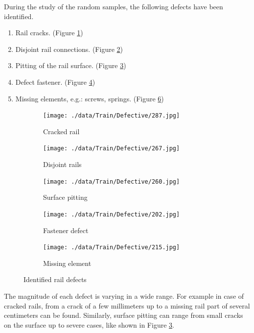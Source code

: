 \documentclass[10pt, final]{article}
\begin{document}
			During the study of the random samples, the following defects have been identified.
			\begin{enumerate}
				\item Rail cracks. (Figure \ref{fig:def_cracked})
				\item Disjoint rail connections. (Figure \ref{fig:def_disjoint})
				\item Pitting of the rail surface. (Figure \ref{fig:def_pitting})
				\item Defect fastener. (Figure \ref{fig:def_nofix})
				\item Missing elements, e.g.: screws, springs. (Figure \ref{fig:def_missing})
			\end{enumerate}
			\begin{figure}[!ht]
				\centering
				\begin{subfigure}{0.3\textwidth}
					\centering
					\texttt{[image: ./data/Train/Defective/287.jpg]}
					\caption{Cracked rail}
					\label{fig:def_cracked}
				\end{subfigure}
				\begin{subfigure}{0.3\textwidth}
					\centering
					\texttt{[image: ./data/Train/Defective/267.jpg]}
					\caption{Disjoint rails}
					\label{fig:def_disjoint}
				\end{subfigure}
				\begin{subfigure}{0.3\textwidth}
					\centering
					\texttt{[image: ./data/Train/Defective/260.jpg]}
					\caption{Surface pitting}
					\label{fig:def_pitting}
				\end{subfigure}
				\begin{subfigure}{0.3\textwidth}
					\centering
					\texttt{[image: ./data/Train/Defective/202.jpg]}
					\caption{Fastener defect}
					\label{fig:def_nofix}
				\end{subfigure}
				\begin{subfigure}{0.3\textwidth}
					\centering
					\texttt{[image: ./data/Train/Defective/215.jpg]}
					\caption{Missing element}
					\label{fig:def_missing}
				\end{subfigure}
				\caption{Identified rail defects}
			\end{figure}
			The magnitude of each defect is varying in a wide range. 
			For example in case of cracked rails, from a crack of a few millimeters up to a missing rail part of several
			centimeters can be found.
			Similarly, surface pitting can range from small cracks on the surface up to severe cases, like shown in
			Figure \ref{fig:def_pitting}.
\end{document}
